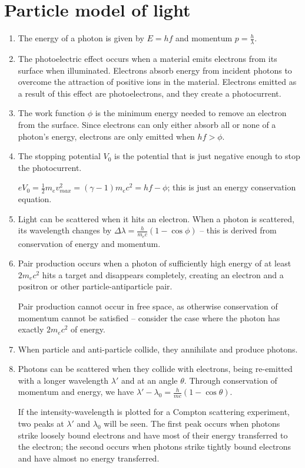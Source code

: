 \section{Particle model of light}
\begin{enumerate}
    \item The energy of a photon is given by \(E = hf\) and momentum \(p = \frac{h}{\lambda}\).
    \item The photoelectric effect occurs when a material emits electrons from its surface when illuminated. Electrons absorb energy from incident photons to overcome the attraction of positive ions in the material. Electrons emitted as a result of this effect are photoelectrons, and they create a photocurrent.
    \item The work function \(\phi\) is the minimum energy needed to remove an electron from the surface. Since electrons can only either absorb all or none of a photon's energy, electrons are only emitted when \(hf > \phi\).
    \item The stopping potential \(V_0\) is the potential that is just negative enough to stop the photocurrent.
    
    \(eV_0 = \frac{1}{2}m_ev^2_{max} = (\gamma-1)m_ec^2 = hf - \phi\); this is just an energy conservation equation.
    \item Light can be scattered when it hits an electron. When a photon is scattered, its wavelength changes by \(\Delta\lambda = \frac{h}{m_ec}(1-\cos\phi)\) -- this is derived from conservation of energy and momentum.
    \item Pair production occurs when a photon of sufficiently high energy of at least \(2m_ec^2\) hits a target and disappears completely, creating an electron and a positron or other particle-antiparticle pair.
    
    Pair production cannot occur in free space, as otherwise conservation of momentum cannot be satisfied -- consider the case where the photon has exactly \(2m_ec^2\) of energy.
    \item When particle and anti-particle collide, they annihilate and produce photons.
    \item Photons can be scattered when they collide with electrons, being re-emitted with a longer wavelength \(\lambda\prime\) and at an angle \(\theta\). Through conservation of momentum and energy, we have \(\lambda\prime - \lambda_0 = \frac{h}{mc}(1-\cos\theta)\).
    
    If the intensity-wavelength is plotted for a Compton scattering experiment, two peaks at \(\lambda\prime\) and \(\lambda_0\) will be seen. The first peak occurs when photons strike loosely bound electrons and have most of their energy transferred to the electron; the second occurs when photons strike tightly bound electrons and have almost no energy transferred.
\end{enumerate}
